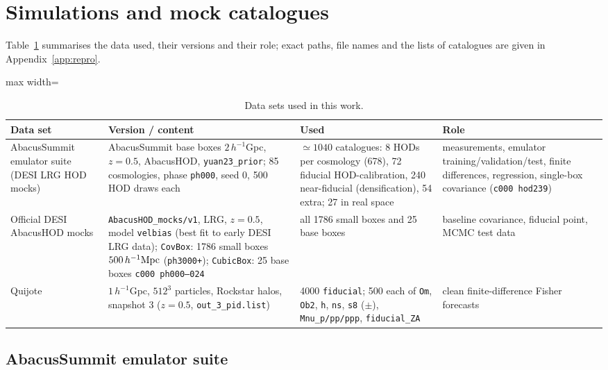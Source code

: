 \section{Simulations and mock catalogues}
\label{sec:sims}

Table~\ref{tab:datasets} summarises the data used, their versions and their role; exact paths, file names and the lists of catalogues are given in Appendix~\ref{app:repro}.

\begin{table}[!tp]
\centering\small
\begin{adjustbox}{max width=\textwidth}
\begin{tabular}{p{3.3cm}p{4.6cm}p{4.3cm}p{4.3cm}}
\toprule
Data set & Version / content & Used & Role \\
\midrule
AbacusSummit emulator suite (DESI LRG HOD mocks) & AbacusSummit base boxes $2\,h^{-1}$Gpc, $z=0.5$, AbacusHOD, \texttt{yuan23\_prior}; 85 cosmologies, phase \texttt{ph000}, seed 0, 500 HOD draws each & $\simeq1040$ catalogues: 8 HODs per cosmology (678), 72 fiducial HOD-calibration, 240 near-fiducial (densification), 54 extra; 27 in real space & measurements, emulator training/validation/test, finite differences, regression, single-box covariance (\texttt{c000 hod239}) \\
Official DESI AbacusHOD mocks & \texttt{AbacusHOD\_mocks/v1}, LRG, $z=0.5$, model \texttt{velbias} (best fit to early DESI LRG data); \texttt{CovBox}: 1786 small boxes $500\,h^{-1}\mathrm{Mpc}$ (\texttt{ph3000+}); \texttt{CubicBox}: 25 base boxes \texttt{c000 ph000--024} & all 1786 small boxes and 25 base boxes & baseline covariance, fiducial point, MCMC test data \\
Quijote & $1\,h^{-1}$Gpc, $512^3$ particles, Rockstar halos, snapshot 3 ($z=0.5$, \texttt{out\_3\_pid.list}) & 4000 \texttt{fiducial}; 500 each of \texttt{Om}, \texttt{Ob2}, \texttt{h}, \texttt{ns}, \texttt{s8} ($\pm$), \texttt{Mnu\_p/pp/ppp}, \texttt{fiducial\_ZA} & clean finite-difference Fisher forecasts \\
\bottomrule
\end{tabular}
\end{adjustbox}
\caption{Data sets used in this work.}
\label{tab:datasets}
\end{table}

\subsection{AbacusSummit emulator suite}


